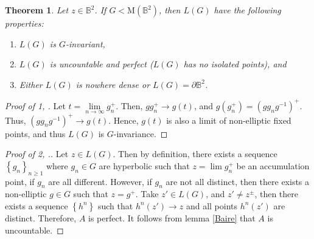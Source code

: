 \documentclass[12pt,oneside]{sfsuthesis}
\theoremstyle{plain} %
\newtheorem{theorem}{Theorem}[chapter]
\theoremstyle{definition}  %
\theoremstyle{remark}  %
\theoremstyle{plain}
\begin{document}
{\begin{theorem}\label{limit_set_thm}
Let $z\in\mathbb{B}^2$. If $G<\text{M}(\mathbb{B}^2)$, then $L(G)$ have the following properties:
\begin{enumerate}
\item $L(G)$ is $G$-invariant, 
\item $L(G)$ is uncountable and perfect ($L(G)$ has no isolated points), and
\item Either $L(G)$ is nowhere dense or $L(G)=\partial \mathbb{B}^2$.
\end{enumerate}
\end{theorem}
\begin{proof}[Proof of 1, \cite{series2008hyperbolic}]
Let $t=\lim\limits_{n\to\infty}g_n^+$. Then, $gg_n^+\to g(t)$, and $g(g_n^+)=(gg_ng^{-1})^{+}$. Thus, $(gg_ng^{-1})^{+}\to g(t)$. Hence, $g(t)$ is also a limit of non-elliptic fixed points, and thus $L(G)$ is $G$-invariance.
\end{proof}
\begin{proof}[Proof of 2, \cite{series2008hyperbolic}.]
Let $z\in L(G)$. Then by definition, there exists a sequence $\left\lbrace g_n\right\rbrace_{n\geq 1}$ where $g_n\in G$ are hyperbolic such that $z=\lim g_n^+$ be an accumulation point, if $g_n$ are all different. However, if $g_n$ are not all distinct, then there exists a non-elliptic $g\in G$ such that $z=g^{+}$. Take $z'\in L(G)$, and $z'\neq z^{\pm}$, then there exists a sequence $\left\lbrace h^n\right\rbrace$ such that $h^n(z')\to z$ and all points $h^n(z')$ are distinct. Therefore, $A$ is perfect. It follows from lemma \ref{Baire} that $A$ is uncountable.

\end{proof}}
\end{document}
